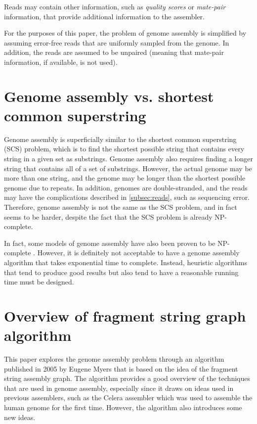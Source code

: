 \documentclass[10pt]{article}
\begin{document}
Reads may contain other information, such as {\it quality scores} or {\it
mate-pair} information, that provide additional information to the assembler.

For the purposes of this paper, the problem of genome assembly is simplified by
assuming error-free reads that are uniformly sampled from the genome.  In
addition, the reads are assumed to be unpaired (meaning that mate-pair
information, if available, is not used).

\section{Genome assembly vs. shortest common superstring}

Genome assembly is superficially similar to the shortest common superstring
(SCS) problem, which is to find the shortest possible string that contains every
string in a given set as substrings.  Genome assembly also requires finding a
longer string that contains all of a set of substrings.  However, the actual
genome may be more than one string, and the genome may be longer than the
shortest possible genome due to repeats.  In addition,  genomes are
double-stranded, and the reads may have the complications described in
\ref{subsec:reads}, such as sequencing error.  Therefore, genome assembly is not
the same as the SCS problem, and in fact seems to be harder, despite the fact
that the SCS problem is already NP-complete\cite{Turner1989}.

In fact, some models of genome assembly have also been proven to be NP-complete
\cite{Medvedev2007}.  However, it is definitely not acceptable to have a genome
assembly algorithm that takes exponential time to complete.  Instead, heuristic
algorithms that tend to produce good results but also tend to have a reasonable
running time must be designed.

\section{Overview of fragment string graph algorithm}

This paper explores the genome assembly problem through an algorithm published
in 2005 by Eugene Myers\cite{Myers2005} that is based on the idea of the
fragment string assembly graph.  The algorithm provides a good overview of the
techniques that are used in genome assembly, especially since it draws on ideas
used in previous assemblers, such as the Celera assembler which was used to
assemble the human genome for the first time\cite{Venter2001}.  However, the
algorithm also introduces some new ideas.
\end{document}
